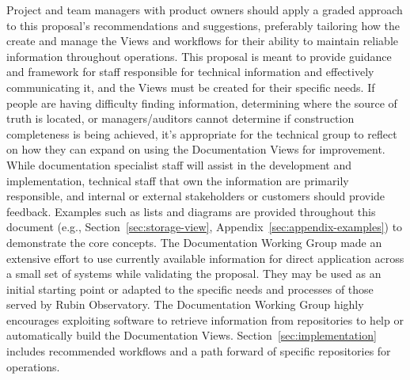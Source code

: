 Project and team managers with product owners should apply a graded approach to this proposal's recommendations and suggestions, preferably tailoring how the create and manage the Views and workflows for their ability to maintain reliable information throughout operations.
This proposal is meant to provide guidance and framework for staff responsible for technical information and effectively communicating it, and the Views must be created for their specific needs.
If people are having difficulty finding information, determining where the source of truth is located, or managers/auditors cannot determine if construction completeness is being achieved, it's appropriate for the technical group to reflect on how they can expand on using the Documentation Views for improvement.
While documentation specialist staff will assist in the development and implementation, technical staff that own the information are primarily responsible, and internal or external stakeholders or customers should provide feedback.
Examples such as lists and diagrams are provided throughout this document (e.g., Section~\ref{sec:storage-view}, Appendix~\ref{sec:appendix-examples}) to demonstrate the core concepts.
The Documentation Working Group made an extensive effort to use currently available information for direct application across a small set of systems while validating the proposal.
They may be used as an initial starting point or adapted to the specific needs and processes of those served by Rubin Observatory.
The Documentation Working Group highly encourages exploiting software to retrieve information from repositories to help or automatically build the Documentation Views.
Section~\ref{sec:implementation} includes recommended workflows and a path forward of specific repositories for operations.
